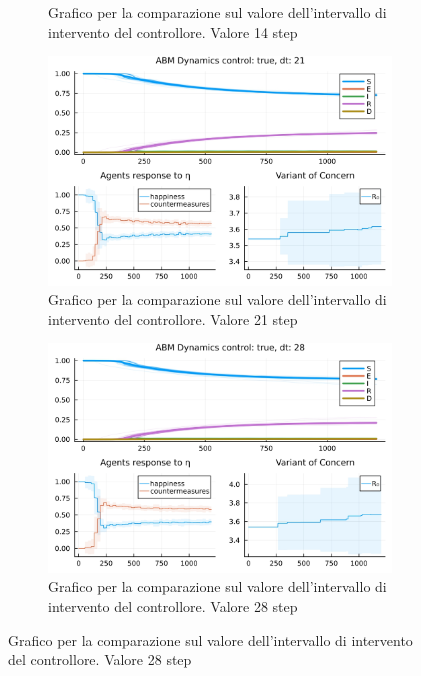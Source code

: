 \begin{figure}[H]
\begin{subfigure}[b]{0.45\textwidth}
		\caption{Grafico per la comparazione sul valore dell'intervallo di intervento del controllore. Valore 14 step}
		\label{fig:comparison_dt_14}
	\end{subfigure}
	\hfill
	\begin{subfigure}[b]{0.45\textwidth}
		\centering
		\includegraphics[width=\textwidth]{img/SocialNetworkABM_3_DT.jpg}
		\caption{Grafico per la comparazione sul valore dell'intervallo di intervento del controllore. Valore 21 step}
		\label{fig:comparison_dt_21}
	\end{subfigure}
	\hfill
	\begin{subfigure}[b]{0.45\textwidth}
		\centering
		\includegraphics[width=\textwidth]{img/SocialNetworkABM_4_DT.jpg}
		\caption{Grafico per la comparazione sul valore dell'intervallo di intervento del controllore. Valore 28 step}
		\label{fig:comparison_dt_28}
	\end{subfigure}
\end{figure}


